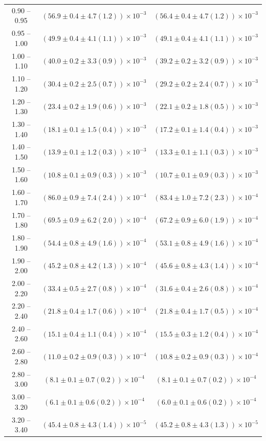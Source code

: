 \begin{table}
\begin{center}
\begin{tabular}{ c | c c }
0.90 -- 0.95 & $(56.9\pm0.4\pm4.7(1.2))\times10^{-3}$ & $(56.4\pm0.4\pm4.7(1.2))\times10^{-3}$ \\ 
0.95 -- 1.00 & $(49.9\pm0.4\pm4.1(1.1))\times10^{-3}$ & $(49.1\pm0.4\pm4.1(1.1))\times10^{-3}$ \\ 
1.00 -- 1.10 & $(40.0\pm0.2\pm3.3(0.9))\times10^{-3}$ & $(39.2\pm0.2\pm3.2(0.9))\times10^{-3}$ \\ 
1.10 -- 1.20 & $(30.4\pm0.2\pm2.5(0.7))\times10^{-3}$ & $(29.2\pm0.2\pm2.4(0.7))\times10^{-3}$ \\ 
1.20 -- 1.30 & $(23.4\pm0.2\pm1.9(0.6))\times10^{-3}$ & $(22.1\pm0.2\pm1.8(0.5))\times10^{-3}$ \\ 
1.30 -- 1.40 & $(18.1\pm0.1\pm1.5(0.4))\times10^{-3}$ & $(17.2\pm0.1\pm1.4(0.4))\times10^{-3}$ \\ 
1.40 -- 1.50 & $(13.9\pm0.1\pm1.2(0.3))\times10^{-3}$ & $(13.3\pm0.1\pm1.1(0.3))\times10^{-3}$ \\ 
1.50 -- 1.60 & $(10.8\pm0.1\pm0.9(0.3))\times10^{-3}$ & $(10.7\pm0.1\pm0.9(0.3))\times10^{-3}$ \\ 
1.60 -- 1.70 & $(86.0\pm0.9\pm7.4(2.4))\times10^{-4}$ & $(83.4\pm1.0\pm7.2(2.3))\times10^{-4}$ \\ 
1.70 -- 1.80 & $(69.5\pm0.9\pm6.2(2.0))\times10^{-4}$ & $(67.2\pm0.9\pm6.0(1.9))\times10^{-4}$ \\ 
1.80 -- 1.90 & $(54.4\pm0.8\pm4.9(1.6))\times10^{-4}$ & $(53.1\pm0.8\pm4.9(1.6))\times10^{-4}$ \\ 
1.90 -- 2.00 & $(45.2\pm0.8\pm4.2(1.3))\times10^{-4}$ & $(45.6\pm0.8\pm4.3(1.4))\times10^{-4}$ \\ 
2.00 -- 2.20 & $(33.4\pm0.5\pm2.7(0.8))\times10^{-4}$ & $(31.6\pm0.4\pm2.6(0.8))\times10^{-4}$ \\ 
2.20 -- 2.40 & $(21.8\pm0.4\pm1.7(0.6))\times10^{-4}$ & $(21.8\pm0.4\pm1.7(0.5))\times10^{-4}$ \\ 
2.40 -- 2.60 & $(15.1\pm0.4\pm1.1(0.4))\times10^{-4}$ & $(15.5\pm0.3\pm1.2(0.4))\times10^{-4}$ \\ 
2.60 -- 2.80 & $(11.0\pm0.2\pm0.9(0.3))\times10^{-4}$ & $(10.8\pm0.2\pm0.9(0.3))\times10^{-4}$ \\ 
2.80 -- 3.00 & $(8.1\pm0.1\pm0.7(0.2))\times10^{-4}$ & $(8.1\pm0.1\pm0.7(0.2))\times10^{-4}$ \\ 
3.00 -- 3.20 & $(6.1\pm0.1\pm0.6(0.2))\times10^{-4}$ & $(6.0\pm0.1\pm0.6(0.2))\times10^{-4}$ \\ 
3.20 -- 3.40 & $(45.4\pm0.8\pm4.3(1.4))\times10^{-5}$ & $(45.2\pm0.8\pm4.3(1.3))\times10^{-5}$ \\ 

\end{tabular}
\end{center}
\end{table}
